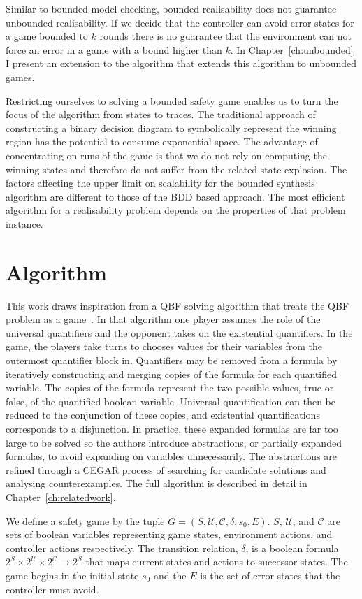 Similar to bounded model checking, bounded realisability does not guarantee unbounded realisability.  If we decide that the controller can avoid error states for a game bounded to $k$ rounds there is no guarantee that the environment can not force an error in a game with a bound higher than $k$. In Chapter~\ref{ch:unbounded} I present an extension to the algorithm that extends this algorithm to unbounded games.

Restricting ourselves to solving a bounded safety game enables us to turn the focus of the algorithm from states to traces. The traditional approach of constructing a binary decision diagram to symbolically represent the winning region has the potential to consume exponential space. The advantage of concentrating on runs of the game is that we do not rely on computing the winning states and therefore do not suffer from the related state explosion. The factors affecting the upper limit on scalability for the bounded synthesis algorithm are different to those of the BDD based approach. The most efficient algorithm for a realisability problem depends on the properties of that problem instance.

\section{Algorithm}

This work draws inspiration from a QBF solving algorithm that treats the QBF problem as a game~\cite{Janota12}. In that algorithm one player assumes the role of the universal quantifiers and the opponent takes on the existential quantifiers. In the game, the players take turns to chooses values for their variables from the outermost quantifier block in. Quantifiers may be removed from a formula by iteratively constructing and merging copies of the formula for each quantified variable. The copies of the formula represent the two possible values, true or false, of the quantified boolean variable. Universal quantification can then be reduced to the conjunction of these copies, and existential quantifications corresponds to a disjunction. In practice, these expanded formulas are far too large to be solved so the authors introduce abstractions, or partially expanded formulas, to avoid expanding on variables unnecessarily. The abstractions are refined through a CEGAR process of searching for candidate solutions and analysing counterexamples. The full algorithm is described in detail in Chapter~\ref{ch:relatedwork}. 

We define a safety game by the tuple $G = (S, \mathcal{U}, \mathcal{C}, \delta, s_0, E)$. $S$, $\mathcal{U}$, and $\mathcal{C}$ are sets of boolean variables representing game states, environment actions, and controller actions respectively. The transition relation, $\delta$, is a boolean formula $2^{S} \times 2^{\mathcal{U}} \times 2^{\mathcal{C}} \to 2^{S}$ that maps current states and actions to successor states. The game begins in the initial state $s_0$ and the $E$ is the set of error states that the controller must avoid.

